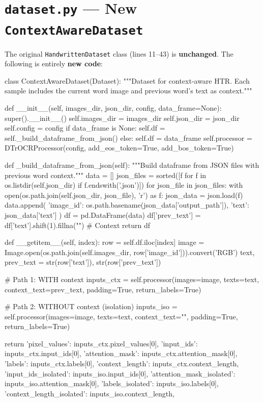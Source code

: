 \documentclass[11pt, a4paper]{report}
\begin{document}
\section{\texttt{dataset.py} --- New \texttt{ContextAwareDataset}}
\label{sec:code-dataset}

The original \texttt{HandwrittenDataset} class (lines 11--43) is \textbf{unchanged}. The following is entirely \textbf{new code}:

\begin{newcode}
class ContextAwareDataset(Dataset):
    """Dataset for context-aware HTR. Each sample includes
    the current word image and previous word's text as context."""

    def __init__(self, images_dir, json_dir, config, data_frame=None):
        super().__init__()
        self.images_dir = images_dir
        self.json_dir = json_dir
        self.config = config
        if data_frame is None:
            self.df = self._build_dataframe_from_json()
        else:
            self.df = data_frame
        self.processor = DTrOCRProcessor(config, add_eos_token=True, add_bos_token=True)

    def _build_dataframe_from_json(self):
        """Build dataframe from JSON files with previous word context."""
        data = []
        json_files = sorted([f for f in os.listdir(self.json_dir)
                            if f.endswith('.json')])
        for json_file in json_files:
            with open(os.path.join(self.json_dir, json_file), 'r') as f:
                json_data = json.load(f)
            data.append({
                'image_id': os.path.basename(json_data['output_path']),
                'text': json_data['text']
            })
        df = pd.DataFrame(data)
        df['prev_text'] = df['text'].shift(1).fillna("")  # Context
        return df

    def __getitem__(self, index):
        row = self.df.iloc[index]
        image = Image.open(os.path.join(self.images_dir,
                          row['image_id'])).convert('RGB')
        text, prev_text = str(row['text']), str(row['prev_text'])

        # Path 1: WITH context
        inputs_ctx = self.processor(images=image, texts=text,
            context_text=prev_text, padding=True, return_labels=True)

        # Path 2: WITHOUT context (isolation)
        inputs_iso = self.processor(images=image, texts=text,
            context_text="", padding=True, return_labels=True)

        return {
            'pixel_values': inputs_ctx.pixel_values[0],
            'input_ids': inputs_ctx.input_ids[0],
            'attention_mask': inputs_ctx.attention_mask[0],
            'labels': inputs_ctx.labels[0],
            'context_length': inputs_ctx.context_length,
            'input_ids_isolated': inputs_iso.input_ids[0],
            'attention_mask_isolated': inputs_iso.attention_mask[0],
            'labels_isolated': inputs_iso.labels[0],
            'context_length_isolated': inputs_iso.context_length,
        }
\end{newcode}
\end{document}
